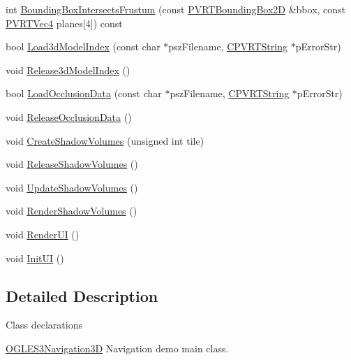 \begin{DoxyCompactItemize}
\item 
int \hyperlink{class_o_g_l_e_s3_navigation3_d_abd2fef4f18b358b56f5df46e0fe5a370}{Bounding\+Box\+Intersects\+Frustum} (const \hyperlink{struct_p_v_r_t_bounding_box2_d}{P\+V\+R\+T\+Bounding\+Box2\+D} \&bbox, const \hyperlink{struct_p_v_r_t_vec4}{P\+V\+R\+T\+Vec4} planes\mbox{[}4\mbox{]}) const 
\item 
bool \hyperlink{class_o_g_l_e_s3_navigation3_d_a1415d966b29ede920c2f8ab3abd60809}{Load3d\+Model\+Index} (const char $\ast$psz\+Filename, \hyperlink{class_c_p_v_r_t_string}{C\+P\+V\+R\+T\+String} $\ast$p\+Error\+Str)
\item 
void \hyperlink{class_o_g_l_e_s3_navigation3_d_a5deb6530e8ad512a9db115769ae3b521}{Release3d\+Model\+Index} ()
\item 
bool \hyperlink{class_o_g_l_e_s3_navigation3_d_a94cc732192a236270fc54f0251b66d05}{Load\+Occlusion\+Data} (const char $\ast$psz\+Filename, \hyperlink{class_c_p_v_r_t_string}{C\+P\+V\+R\+T\+String} $\ast$p\+Error\+Str)
\item 
void \hyperlink{class_o_g_l_e_s3_navigation3_d_ac7672bb7a10b76002afe0bd76d788b0f}{Release\+Occlusion\+Data} ()
\item 
void \hyperlink{class_o_g_l_e_s3_navigation3_d_a544175a68d5304842dbc5ef16ff725df}{Create\+Shadow\+Volumes} (unsigned int tile)
\item 
void \hyperlink{class_o_g_l_e_s3_navigation3_d_a256302b11b516dce0515eb3924bc4085}{Release\+Shadow\+Volumes} ()
\item 
void \hyperlink{class_o_g_l_e_s3_navigation3_d_a2d88bbde2be80e3905e6e8be4a6bb025}{Update\+Shadow\+Volumes} ()
\item 
void \hyperlink{class_o_g_l_e_s3_navigation3_d_a1f82d9db4ce9aece4d440ef4ebf52075}{Render\+Shadow\+Volumes} ()
\item 
void \hyperlink{class_o_g_l_e_s3_navigation3_d_a6f9864fdc80893b19ad4b4920fea1efd}{Render\+U\+I} ()
\item 
void \hyperlink{class_o_g_l_e_s3_navigation3_d_aeea7857bdf4ebeae6c940b74a0f4a3fd}{Init\+U\+I} ()
\end{DoxyCompactItemize}


\subsection{Detailed Description}


 Class declarations



  \hyperlink{class_o_g_l_e_s3_navigation3_d}{O\+G\+L\+E\+S3\+Navigation3\+D}  Navigation demo main class. 

